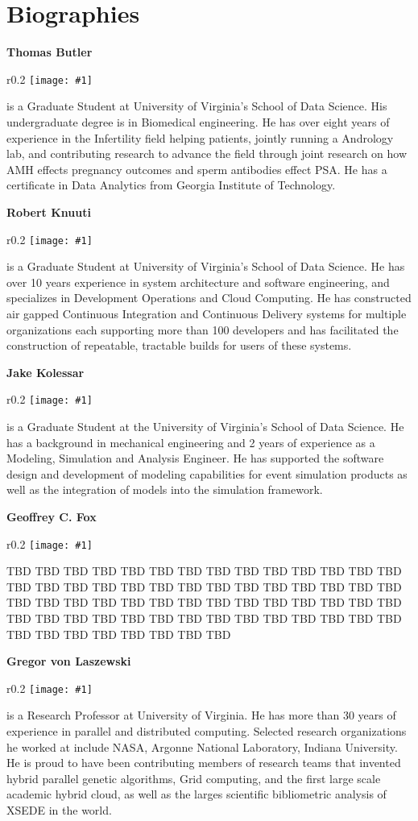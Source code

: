 \documentclass[sigplan,screen]{acmart}
\newcommand{\BIOFIG}[3]{%
\parindent 0pt%
\setlength{\intextsep}{6pt}%
\setlength{\columnsep}{6pt}%

{\bf #2}

\begin{wrapfigure}{r}{0.2\columnwidth}%
    \texttt{[image: \#1]}%
\end{wrapfigure}%
#3%
}
\begin{document}




\section*{Biographies}

\BIOFIG{images/bio/gregor.png}{Thomas Butler}{is a Graduate Student at
  University of Virginia's School of Data Science. His undergraduate
  degree is in Biomedical engineering. He has over eight years of
  experience in the Infertility field helping patients, jointly
  running a Andrology lab, and contributing research to advance the
  field through joint research on how AMH effects pregnancy outcomes
  and sperm antibodies effect PSA. He has a certificate in Data
  Analytics from Georgia Institute of Technology.}

\BIOFIG{images/bio/gregor.png}{Robert Knuuti}{is a Graduate Student at
  University of Virginia's School of Data Science. He has over 10
  years experience in system architecture and software engineering,
  and specializes in Development Operations and Cloud Computing. He
  has constructed air gapped Continuous Integration and Continuous
  Delivery systems for multiple organizations each supporting more
  than 100 developers and has facilitated the construction of
  repeatable, tractable builds for users of these systems.}

\BIOFIG{images/bio/gregor.png}{Jake Kolessar}{is a Graduate Student at
  the University of Virginia's School of Data Science. He has a
  background in mechanical engineering and 2 years of experience as a
  Modeling, Simulation and Analysis Engineer. He has supported the
  software design and development of modeling capabilities for event
  simulation products as well as the integration of models into the
  simulation framework.}

\BIOFIG{images/bio/fox.png}{Geoffrey C. Fox}{TBD TBD TBD TBD TBD
  TBD TBD TBD TBD TBD TBD TBD TBD TBD TBD TBD TBD TBD TBD TBD TBD TBD
  TBD TBD TBD TBD TBD TBD TBD TBD TBD TBD TBD TBD TBD TBD TBD TBD TBD
  TBD TBD TBD TBD TBD TBD TBD TBD TBD TBD TBD TBD TBD TBD TBD TBD TBD
  TBD TBD TBD TBD TBD TBD TBD TBD}



\BIOFIG{images/bio/gregor.png}{Gregor von Laszewski}{is a Research
  Professor at University of Virginia.  He has more than 30 years of
  experience in parallel and distributed computing.  Selected research
  organizations he worked at include NASA, Argonne National
  Laboratory, Indiana University. He is proud to have been
  contributing members of research teams that invented hybrid parallel
  genetic algorithms, Grid computing, and the first large scale
  academic hybrid cloud, as well as the larges scientific bibliometric
  analysis of XSEDE in the world.}
\end{document}
